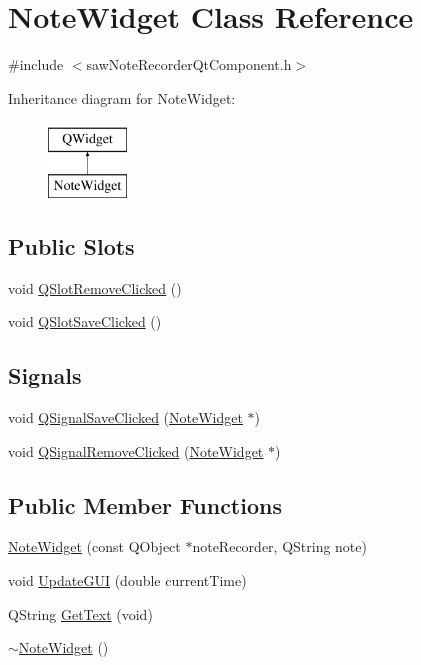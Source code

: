 \hypertarget{class_note_widget}{}\section{Note\+Widget Class Reference}
\label{class_note_widget}


{\ttfamily \#include $<$saw\+Note\+Recorder\+Qt\+Component.\+h$>$}

Inheritance diagram for Note\+Widget\+:\begin{figure}[H]
\begin{center}
\leavevmode
\includegraphics[height=2.000000cm]{dc/d45/class_note_widget}
\end{center}
\end{figure}
\subsection*{Public Slots}
\begin{DoxyCompactItemize}
\item 
void \hyperlink{class_note_widget_a2f63d2838144e5dc403726e5247be0ed}{Q\+Slot\+Remove\+Clicked} ()
\item 
void \hyperlink{class_note_widget_a77c7082ed59d8685d978b8222eb2006d}{Q\+Slot\+Save\+Clicked} ()
\end{DoxyCompactItemize}
\subsection*{Signals}
\begin{DoxyCompactItemize}
\item 
void \hyperlink{class_note_widget_a906399d5dee94c90427c77f6e5f54bc0}{Q\+Signal\+Save\+Clicked} (\hyperlink{class_note_widget}{Note\+Widget} $\ast$)
\item 
void \hyperlink{class_note_widget_a8829ccf707d99486fa870a2aad90ebc6}{Q\+Signal\+Remove\+Clicked} (\hyperlink{class_note_widget}{Note\+Widget} $\ast$)
\end{DoxyCompactItemize}
\subsection*{Public Member Functions}
\begin{DoxyCompactItemize}
\item 
\hyperlink{class_note_widget_a96a21ea07d4ea1c0a188fcb6094abd7e}{Note\+Widget} (const Q\+Object $\ast$note\+Recorder, Q\+String note)
\item 
void \hyperlink{class_note_widget_afdab46348f40af1487ff73c06e08d3ab}{Update\+G\+U\+I} (double current\+Time)
\item 
Q\+String \hyperlink{class_note_widget_a8b1415368d41773530313932d572ffca}{Get\+Text} (void)
\item 
\hyperlink{class_note_widget_a120a4618c97b61339060de31aac78114}{$\sim$\+Note\+Widget} ()
\end{DoxyCompactItemize}


